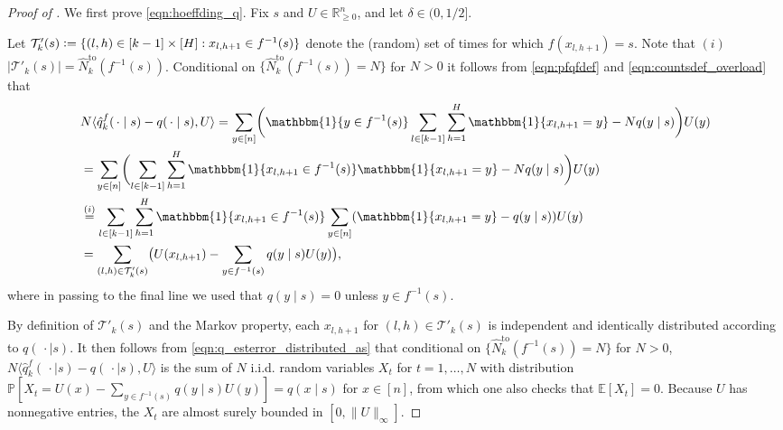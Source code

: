 \documentclass[11pt]{article}
\newcommand{\eqdef}{\vcentcolon=}
\newcommand{\mcT}{\mathcal{T}}
\newcommand{\mbbP}{\mathbb{P}}
\newcommand{\mbbE}{\mathbb{E}}
\newcommand{\mbbR}{\mathbb{R}}
\theoremstyle{definition}
\theoremstyle{definition}
\begin{document}
\begin{proof}[Proof of ]
	We first prove \eqref{eqn:hoeffding_q}.
	Fix $s$ and $U\in\mbbR^n_{\geq0}$, and let $\delta\in(0,1/2]$.

	Let $\mcT'_k(s) \eqdef \{(l,h)\in [k-1]\times [H]: x_{l,h+1}\in f^{-1}(s)\}$ denote the (random) set of times for which $f(x_{l,h+1})=s$.
	Note that $(i)$ $|\mcT'_k(s)|=\hat{N}_k^{\mathrm{to}}(f^{-1}(s))$.
	Conditional on $\{\hat{N}_k^{\mathrm{to}}(f^{-1}(s))=N\}$ for $N>0$ it follows from \eqref{eqn:pfqfdef} and \eqref{eqn:countsdef_overload} that
	\begin{align}
		 &
		N\langle \hat{q}^f_k(\,\cdot \mid s)-q(\,\cdot \mid s), U\rangle
		=
		\sum_{y\in [n]}
		\biggl(
		\mathbbm{1}\{y\in f^{-1}(s)\}\sum_{l\in[k-1]}\sum_{h=1}^H\mathbbm{1}\{x_{l,h+1}=y\}-Nq(y\mid s)
		\biggr)
		U(y)
		\nonumber
		\\
		 &
		=
		\sum_{y\in [n]}
		\biggl(\sum_{l\in[k-1]}\sum_{h=1}^H
		\mathbbm{1}\{x_{l,h+1}\in f^{-1}(s)\}\mathbbm{1}\{x_{l,h+1}=y\}-Nq(y\mid s)
		\biggr)
		U(y)
		\nonumber
		\\
		 &
		\overset{(i)}{=}
		\sum_{l\in[k-1]}
		\sum_{h=1}^H
		\mathbbm{1}\{x_{l,h+1} \in f^{-1}(s)\}\sum_{y\in [n]}(
		\mathbbm{1}\{x_{l,h+1}=y\}-q(y\mid s)
		)
		U(y)
		\nonumber
		\\
		 &
		=
		\sum_{(l,h)\in \mcT'_k(s)}
		\bigl(U(x_{l,h+1})-\sum_{y\in f^{-1}(s)}q(y\mid s) U(y)\bigr),
		\label{eqn:q_esterror_distributed_as}
	\end{align}
	where in passing to the final line we used that $q(y\mid s)=0$ unless $y\in f^{-1}(s)$.

	By definition of $\mcT'_k(s)$ and the Markov property, each $x_{l,h+1}$ for $(l,h)\in \mcT'_k(s)$ is independent and identically distributed according to $q(\,\cdot \mid s)$.
	It then follows from \eqref{eqn:q_esterror_distributed_as} that conditional on $\{\hat{N}^{\mathrm{to}}_k(f^{-1}(s))=N\}$ for $N>0$, $N\langle \hat{q}^f_k(\,\cdot \mid s)-q(\,\cdot \mid s), U\rangle$ is the sum of $N$ i.i.d. random variables $X_t$ for $t=1,\ldots,N$ with distribution $\mbbP[X_t = U(x)-\sum_{y\in f^{-1}(s)}q(y\mid s) U(y)]=q(x\mid s)$ for $x\in[n]$, from which one also checks that $\mbbE[X_t] = 0$.
	Because $U$ has nonnegative entries, the $X_t$ are almost surely bounded in $[0,\lVert U\rVert_{\infty}]$.


\end{proof}
\end{document}
